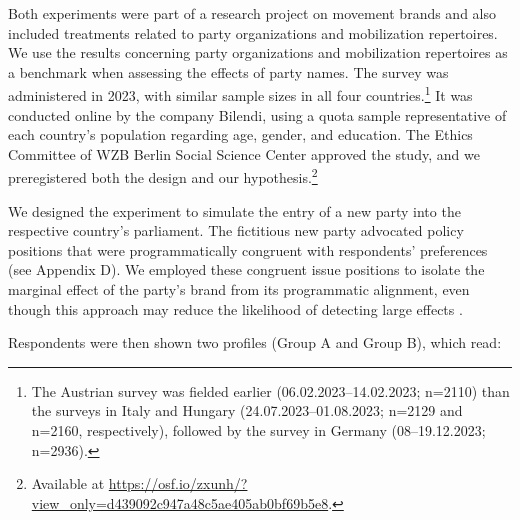 \documentclass[12pt]{article}
\begin{document}
Both experiments were part of a research project on movement brands and also included treatments related to party organizations and mobilization repertoires. We use the results concerning party organizations and mobilization repertoires as a benchmark when assessing the effects of party names. The survey was administered in 2023, with similar sample sizes in all four countries.\footnote{The Austrian survey was fielded earlier (06.02.2023--14.02.2023; n=2110) than the surveys in Italy and Hungary (24.07.2023--01.08.2023; n=2129 and n=2160, respectively), followed by the survey in Germany (08--19.12.2023; n=2936).} It was conducted online by the company Bilendi, using a quota sample representative of each country's population regarding age, gender, and education. The Ethics Committee of WZB Berlin Social Science Center approved the study, and we preregistered both the design and our hypothesis.\footnote{Available at \url{https://osf.io/zxunh/?view_only=d439092c947a48c5ae405ab0bf69b5e8}.}

We designed the experiment to simulate the entry of a new party into the respective country's parliament. The fictitious new party advocated policy positions that were programmatically congruent with respondents' preferences (see Appendix D). We employed these congruent issue positions to isolate the marginal effect of the party's brand from its programmatic alignment, even though this approach may reduce the likelihood of detecting large effects \citep{Titelman_Lauderdale_2025}.

Respondents were then shown two profiles (Group A and Group B), which read:
\end{document}
